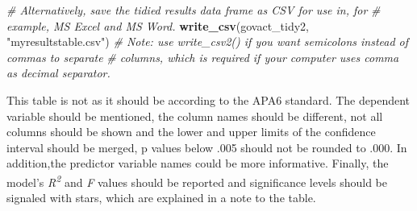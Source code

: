 \documentclass[doc,floatsintext]{apa6}
\newenvironment{Shaded}{\begin{snugshade}}{\end{snugshade}}
\newcommand{\KeywordTok}[1]{\textcolor[rgb]{0.13,0.29,0.53}{\textbf{#1}}}
\newcommand{\StringTok}[1]{\textcolor[rgb]{0.31,0.60,0.02}{#1}}
\newcommand{\CommentTok}[1]{\textcolor[rgb]{0.56,0.35,0.01}{\textit{#1}}}
\newcommand{\NormalTok}[1]{#1}
\begin{document}
\begin{table}[H]

\caption{\label{tab:broom}Unedited statistical results of the interaction model 
                 extracted with tidy() and shown with kable().}
\centering
{}
\end{table}

\begin{Shaded}
\begin{Highlighting}[]
\CommentTok{# Alternatively, save the tidied results data frame as CSV for use in, for}
\CommentTok{# example, MS Excel and MS Word.}
\KeywordTok{write_csv}\NormalTok{(govact_tidy2, }\StringTok{"myresultstable.csv"}\NormalTok{)}
\CommentTok{# Note: use write_csv2() if you want semicolons instead of commas to separate}
\CommentTok{# columns, which is required if your computer uses comma as decimal separator.}
\end{Highlighting}
\end{Shaded}

This table is not as it should be according to the APA6 standard. The
dependent variable should be mentioned, the column names should be
different, not all columns should be shown and the lower and upper
limits of the confidence interval should be merged, p values below .005
should not be rounded to .000. In addition,the predictor variable names
could be more informative. Finally, the model's
\emph{R\textsuperscript{2}} and \emph{F} values should be reported and
significance levels should be signaled with stars, which are explained
in a note to the table.
\end{document}
